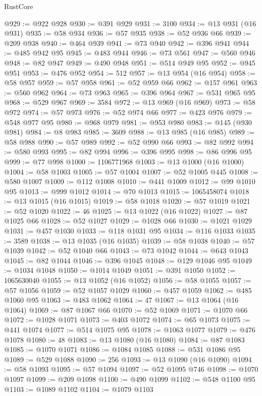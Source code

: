\begin{lexlean}{RustCore}
\begin{coremodule}
@929 := @922 @928
@930 := @391 @929
@931 := 3100
@934 := @13 @931 (@16 @931)
@935 := @58 @934
@936 := @57 @935
@938 := @52 @936 @66
@939 := @209 @938
@940 := @464 @939
@941 := @73 @940
@942 := @396 @941
@944 := @485 @942 @95
@945 := @483 @944
@946 := @73 @561
@947 := @560 @946
@948 := @82 @947
@949 := @490 @948
@951 := @514 @949 @95
@952 := @945 @951
@953 := @476 @952
@954 := 512
@957 := @13 @954 (@16 @954)
@958 := @58 @957
@959 := @57 @958
@961 := @52 @959 @66
@962 := @157 @961
@963 := @560 @962
@964 := @73 @963
@965 := @396 @964
@967 := @531 @965 @95
@968 := @529 @967
@969 := 3584
@972 := @13 @969 (@16 @969)
@973 := @58 @972
@974 := @57 @973
@976 := @52 @974 @66
@977 := @423 @976
@979 := @548 @977 @95
@980 := @968 @979
@981 := @953 @980
@983 := @145 (@930 @981)
@984 := @8 @983
@985 := 3609
@988 := @13 @985 (@16 @985)
@989 := @58 @988
@990 := @57 @989
@992 := @52 @990 @66
@993 := @82 @992
@994 := @580 @993
@995 := @82 @994
@996 := @396 @995
@998 := @86 @996 @95
@999 := @77 @998
@1000 := 1106771968
@1003 := @13 @1000 (@16 @1000)
@1004 := @58 @1003
@1005 := @57 @1004
@1007 := @52 @1005 @445
@1008 := @580 @1007
@1009 := @112 @1008
@1010 := @441 @1009
@1012 := @99 @1010 @95
@1013 := @999 @1012
@1014 := @70 @1013
@1015 := 1065458074
@1018 := @13 @1015 (@16 @1015)
@1019 := @58 @1018
@1020 := @57 @1019
@1021 := @52 @1020
@1022 := 46
@1025 := @13 @1022 (@16 @1022)
@1027 := @87 @1025 @66
@1028 := @52 @1027
@1029 := @1028 @66
@1030 := @1021 @1029
@1031 := @457 @1030
@1033 := @118 @1031 @95
@1034 := @116 @1033
@1035 := 3589
@1038 := @13 @1035 (@16 @1035)
@1039 := @58 @1038
@1040 := @57 @1039
@1042 := @52 @1040 @66
@1043 := @73 @1042
@1044 := @643 @1043
@1045 := @82 @1044
@1046 := @396 @1045
@1048 := @129 @1046 @95
@1049 := @1034 @1048
@1050 := @1014 @1049
@1051 := @391 @1050
@1052 := 1065630040
@1055 := @13 @1052 (@16 @1052)
@1056 := @58 @1055
@1057 := @57 @1056
@1059 := @52 @1057 @1029
@1060 := @457 @1059
@1062 := @485 @1060 @95
@1063 := @483 @1062
@1064 := 47
@1067 := @13 @1064 (@16 @1064)
@1069 := @87 @1067 @66
@1070 := @52 @1069
@1071 := @1070 @66
@1072 := @1028 @1071
@1073 := @403 @1072
@1074 := @65 @1073
@1075 := @441 @1074
@1077 := @514 @1075 @95
@1078 := @1063 @1077
@1079 := @476 @1078
@1080 := 48
@1083 := @13 @1080 (@16 @1080)
@1084 := @87 @1083
@1085 := @1070 @1071
@1086 := @1084 @1085
@1088 := @531 @1086 @95
@1089 := @529 @1088
@1090 := 256
@1093 := @13 @1090 (@16 @1090)
@1094 := @58 @1093
@1095 := @57 @1094
@1097 := @52 @1095 @746
@1098 := @1070 @1097
@1099 := @209 @1098
@1100 := @490 @1099
@1102 := @548 @1100 @95
@1103 := @1089 @1102
@1104 := @1079 @1103

\end{coremodule}
\end{lexlean}
